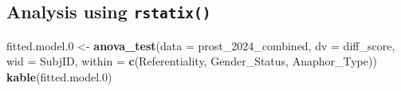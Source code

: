 \documentclass[
  10pt,
]{article}
\newenvironment{Shaded}{\begin{snugshade}}{\end{snugshade}}
\newcommand{\AttributeTok}[1]{\textcolor[rgb]{0.13,0.29,0.53}{#1}}
\newcommand{\FloatTok}[1]{\textcolor[rgb]{0.00,0.00,0.81}{#1}}
\newcommand{\FunctionTok}[1]{\textcolor[rgb]{0.13,0.29,0.53}{\textbf{#1}}}
\newcommand{\NormalTok}[1]{#1}
\newcommand{\OtherTok}[1]{\textcolor[rgb]{0.56,0.35,0.01}{#1}}
\begin{document}
\subsection{\texorpdfstring{Analysis using
\texttt{rstatix()}}{Analysis using rstatix()}}\label{analysis-using-rstatix}

\begin{Shaded}
\begin{Highlighting}[]
\NormalTok{fitted.model}\FloatTok{.0} \OtherTok{\textless{}{-}} \FunctionTok{anova\_test}\NormalTok{(}\AttributeTok{data =}\NormalTok{ prost\_2024\_combined, }
                      \AttributeTok{dv =}\NormalTok{ diff\_score, }
                      \AttributeTok{wid =}\NormalTok{ SubjID, }
                      \AttributeTok{within =} \FunctionTok{c}\NormalTok{(Referentiality, Gender\_Status, Anaphor\_Type))}
\FunctionTok{kable}\NormalTok{(fitted.model}\FloatTok{.0}\NormalTok{)}
\end{Highlighting}
\end{Shaded}
\end{document}
